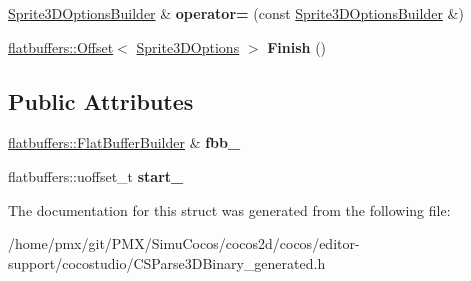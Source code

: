 \begin{DoxyCompactItemize}
\item 
\mbox{\label{structflatbuffers_1_1Sprite3DOptionsBuilder_aec4ec738a87d48d06704505a1cf1beb4}} 
\hyperlink{structflatbuffers_1_1Sprite3DOptionsBuilder}{Sprite3\+D\+Options\+Builder} \& {\bfseries operator=} (const \hyperlink{structflatbuffers_1_1Sprite3DOptionsBuilder}{Sprite3\+D\+Options\+Builder} \&)
\item 
\mbox{\label{structflatbuffers_1_1Sprite3DOptionsBuilder_a933389d01d852198c31c5ebe0ed0a443}} 
\hyperlink{structflatbuffers_1_1Offset}{flatbuffers\+::\+Offset}$<$ \hyperlink{structflatbuffers_1_1Sprite3DOptions}{Sprite3\+D\+Options} $>$ {\bfseries Finish} ()
\end{DoxyCompactItemize}
\subsection*{Public Attributes}
\begin{DoxyCompactItemize}
\item 
\mbox{\label{structflatbuffers_1_1Sprite3DOptionsBuilder_a3f34b85f9caf0d260299c274d097cd1b}} 
\hyperlink{classflatbuffers_1_1FlatBufferBuilder}{flatbuffers\+::\+Flat\+Buffer\+Builder} \& {\bfseries fbb\+\_\+}
\item 
\mbox{\label{structflatbuffers_1_1Sprite3DOptionsBuilder_a2cc4bce38b66147b53dd47dc8c420952}} 
flatbuffers\+::uoffset\+\_\+t {\bfseries start\+\_\+}
\end{DoxyCompactItemize}


The documentation for this struct was generated from the following file\+:\begin{DoxyCompactItemize}
\item 
/home/pmx/git/\+P\+M\+X/\+Simu\+Cocos/cocos2d/cocos/editor-\/support/cocostudio/C\+S\+Parse3\+D\+Binary\+\_\+generated.\+h\end{DoxyCompactItemize}
